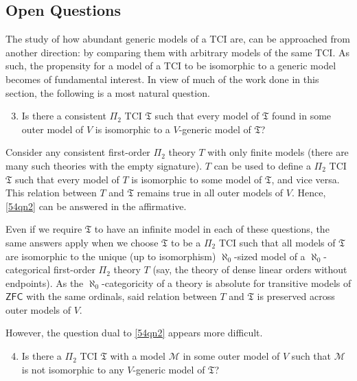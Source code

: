 \documentclass[12pt]{article}
\numberwithin{equation}{section}
\begin{document}
\subsection{Open Questions}

The study of how abundant generic models of a TCI are, can be approached from another direction: by comparing them with arbitrary models of the same TCI. As such, the propensity for a model of a TCI to be isomorphic to a generic model becomes of fundamental interest. In view of much of the work done in this section, the following is a most natural question.

\begin{enumerate}[label=(Q\arabic*)]
    \setcounter{enumi}{2}
    \item\label{54qn2} Is there a consistent $\Pi_2$ TCI $\mathfrak{T}$ such that every model of $\mathfrak{T}$ found in some outer model of $V$ is isomorphic to a $V$-generic model of $\mathfrak{T}$?
\end{enumerate}

Consider any consistent first-order $\Pi_2$ theory $T$ with only finite models (there are many such theories with the empty signature). $T$ can be used to define a $\Pi_2$ TCI $\mathfrak{T}$ such that every model of $T$ is isomorphic to some model of $\mathfrak{T}$, and vice versa. This relation between $T$ and $\mathfrak{T}$ remains true in all outer models of $V$. Hence, \ref{54qn2} can be answered in the affirmative. 

Even if we require $\mathfrak{T}$ to have an infinite model in each of these questions, the same answers apply when we choose $\mathfrak{T}$ to be a $\Pi_2$ TCI such that all models of $\mathfrak{T}$ are isomorphic to the unique (up to isomorphism) $\aleph_0$-sized model of a $\aleph_0$-categorical first-order $\Pi_2$ theory $T$ (say, the theory of dense linear orders without endpoints). As the $\aleph_0$-categoricity of a theory is absolute for transitive models of $\mathsf{ZFC}$ with the same ordinals, said relation between $T$ and $\mathfrak{T}$ is preserved across outer models of $V$.

However, the question dual to \ref{54qn2} appears more difficult.

\begin{enumerate}[label=(Q\arabic*)]
    \setcounter{enumi}{3}
    \item\label{54qn3} Is there a $\Pi_2$ TCI $\mathfrak{T}$ with a model $\mathcal{M}$ in some outer model of $V$ such that $\mathcal{M}$ is not isomorphic to any $V$-generic model of $\mathfrak{T}$?
\end{enumerate}
\end{document}
